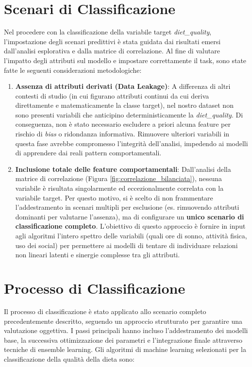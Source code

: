 \section{Scenari di Classificazione}

Nel procedere con la classificazione della variabile target \textit{diet\_quality}, l'impostazione degli scenari predittivi è stata guidata dai risultati emersi dall'analisi esplorativa e dalla matrice di correlazione. Al fine di valutare l'impatto degli attributi sul modello e impostare correttamente il task, sono state fatte le seguenti considerazioni metodologiche:

\begin{enumerate}
    \item \textbf{Assenza di attributi derivati (Data Leakage)}: A differenza di altri contesti di studio (in cui figurano attributi continui da cui deriva direttamente e matematicamente la classe target), nel nostro dataset non sono presenti variabili che anticipino deterministicamente la \textit{diet\_quality}. Di conseguenza, non è stato necessario escludere a priori alcuna feature per rischio di \textit{bias} o ridondanza informativa. Rimuovere ulteriori variabili in questa fase avrebbe compromesso l'integrità dell'analisi, impedendo ai modelli di apprendere dai reali pattern comportamentali.
    
    \item \textbf{Inclusione totale delle feature comportamentali}: Dall'analisi della matrice di correlazione (Figura \ref{fig:correlazione_bilanciata}), nessuna variabile è risultata singolarmente ed eccezionalmente correlata con la variabile target. Per questo motivo, si è scelto di non frammentare l'addestramento in scenari multipli per esclusione (es. rimuovendo attributi dominanti per valutarne l'assenza), ma di configurare un \textbf{unico scenario di classificazione completo}. L'obiettivo di questo approccio è fornire in input agli algoritmi l'intero spettro delle variabili (quali ore di sonno, attività fisica, uso dei social) per permettere ai modelli di tentare di individuare relazioni non lineari latenti e sinergie complesse tra gli attributi.
\end{enumerate}

\section{Processo di Classificazione}

Il processo di classificazione è stato applicato allo scenario completo precedentemente descritto, seguendo un approccio strutturato per garantire una valutazione oggettiva. I passi principali hanno incluso l'addestramento dei modelli base, la successiva ottimizzazione dei parametri e l'integrazione finale attraverso tecniche di ensemble learning.
Gli algoritmi di machine learning selezionati per la classificazione della qualità della dieta sono:

